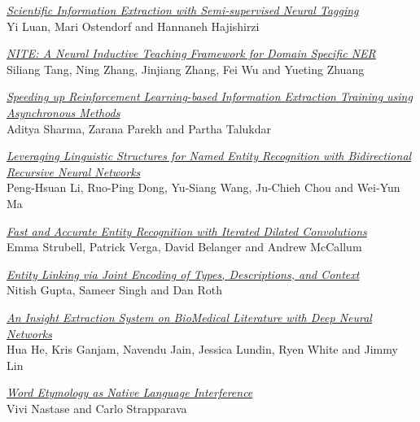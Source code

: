 \hyperlink{page.2624}{\em Scientific Information Extraction with Semi-supervised Neural Tagging}\samepage \\
\hspace*{7mm} Yi Luan, Mari Ostendorf and Hannaneh Hajishirzi\dotfill {}

\hyperlink{page.2635}{\em NITE: A Neural Inductive Teaching Framework for Domain Specific NER}\samepage \\
\hspace*{7mm} Siliang Tang, Ning Zhang, Jinjiang Zhang, Fei Wu and Yueting Zhuang\dotfill {}

\hyperlink{page.2641}{\em Speeding up Reinforcement Learning-based Information Extraction Training using Asynchronous Methods}\samepage \\
\hspace*{7mm} Aditya Sharma, Zarana Parekh and Partha Talukdar\dotfill {}

\hyperlink{page.2647}{\em Leveraging Linguistic Structures for Named Entity Recognition with Bidirectional Recursive Neural Networks}\samepage \\
\hspace*{7mm} Peng-Hsuan Li, Ruo-Ping Dong, Yu-Siang Wang, Ju-Chieh Chou and Wei-Yun Ma\dotfill {}

\hyperlink{page.2653}{\em Fast and Accurate Entity Recognition with Iterated Dilated Convolutions}\samepage \\
\hspace*{7mm} Emma Strubell, Patrick Verga, David Belanger and Andrew McCallum\dotfill {}

\hyperlink{page.2664}{\em Entity Linking via Joint Encoding of Types, Descriptions, and Context}\samepage \\
\hspace*{7mm} Nitish Gupta, Sameer Singh and Dan Roth\dotfill {}

\hyperlink{page.2674}{\em An Insight Extraction System on BioMedical Literature with Deep Neural Networks}\samepage \\
\hspace*{7mm} Hua He, Kris Ganjam, Navendu Jain, Jessica Lundin, Ryen White and Jimmy Lin\dotfill {}

\hyperlink{page.2685}{\em Word Etymology as Native Language Interference}\samepage \\
\hspace*{7mm} Vivi Nastase and Carlo Strapparava\dotfill {}

